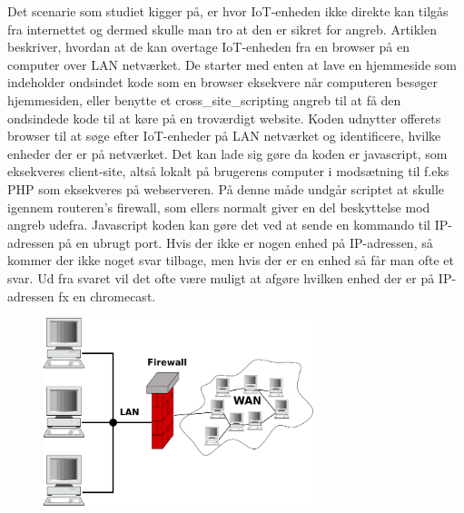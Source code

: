 Det scenarie som studiet kigger på, er hvor IoT-enheden ikke direkte kan tilgås fra internettet og dermed skulle man tro at den er sikret for angreb. Artiklen beskriver, hvordan at de kan overtage IoT-enheden fra en browser på en computer over LAN netværket.
De starter med enten at lave en hjemmeside som indeholder ondsindet kode som en browser eksekvere når computeren besøger hjemmesiden, eller benytte et \gls{cross_site_scripting} angreb til at få den ondsindede kode til at køre på en troværdigt website. Koden udnytter offerets browser til at søge efter IoT-enheder på LAN netværket og identificere, hvilke enheder der er på netværket. Det kan lade sig gøre da koden er javascript, som eksekveres client-site, altså lokalt på brugerens computer i modsætning til f.eks PHP som eksekveres på webserveren. På denne måde undgår scriptet at skulle igennem routeren's firewall, som ellers normalt giver en del beskyttelse mod angreb udefra.
Javascript koden kan gøre det ved at sende en kommando til IP-adressen på en ubrugt port. Hvis der ikke er nogen enhed på IP-adressen, så kommer der ikke noget svar tilbage, men hvis der er en enhed så får man ofte et svar. Ud fra svaret vil det ofte være muligt at afgøre hvilken enhed der er på IP-adressen fx en chromecast.\\
    \begin{figure}[H]
        \centering
            \includegraphics[width=0.7\textwidth]{figures/800px-Gateway_firewall.png}
        \caption{\label{fig:updates}}
    \end{figure}
